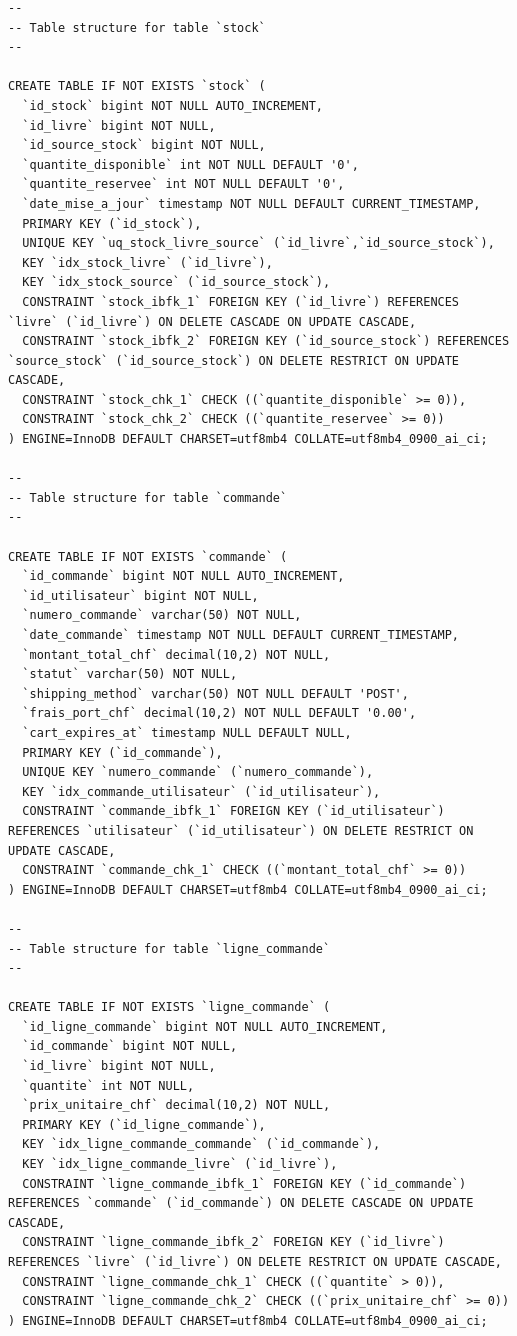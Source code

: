 \documentclass[12pt, a4paper]{report}
\renewcommand{\_}{\origunderscore\allowbreak}
\begin{document}
\begin{lstlisting}[style=sqlstyle, caption={Script DDL — Création de la base de données CARIBOOKS (extrait verbatim de \texttt{Schema.SQL})}, label={lst:ddl}]
--
-- Table structure for table `stock`
--

CREATE TABLE IF NOT EXISTS `stock` (
  `id_stock` bigint NOT NULL AUTO_INCREMENT,
  `id_livre` bigint NOT NULL,
  `id_source_stock` bigint NOT NULL,
  `quantite_disponible` int NOT NULL DEFAULT '0',
  `quantite_reservee` int NOT NULL DEFAULT '0',
  `date_mise_a_jour` timestamp NOT NULL DEFAULT CURRENT_TIMESTAMP,
  PRIMARY KEY (`id_stock`),
  UNIQUE KEY `uq_stock_livre_source` (`id_livre`,`id_source_stock`),
  KEY `idx_stock_livre` (`id_livre`),
  KEY `idx_stock_source` (`id_source_stock`),
  CONSTRAINT `stock_ibfk_1` FOREIGN KEY (`id_livre`) REFERENCES `livre` (`id_livre`) ON DELETE CASCADE ON UPDATE CASCADE,
  CONSTRAINT `stock_ibfk_2` FOREIGN KEY (`id_source_stock`) REFERENCES `source_stock` (`id_source_stock`) ON DELETE RESTRICT ON UPDATE CASCADE,
  CONSTRAINT `stock_chk_1` CHECK ((`quantite_disponible` >= 0)),
  CONSTRAINT `stock_chk_2` CHECK ((`quantite_reservee` >= 0))
) ENGINE=InnoDB DEFAULT CHARSET=utf8mb4 COLLATE=utf8mb4_0900_ai_ci;

--
-- Table structure for table `commande`
--

CREATE TABLE IF NOT EXISTS `commande` (
  `id_commande` bigint NOT NULL AUTO_INCREMENT,
  `id_utilisateur` bigint NOT NULL,
  `numero_commande` varchar(50) NOT NULL,
  `date_commande` timestamp NOT NULL DEFAULT CURRENT_TIMESTAMP,
  `montant_total_chf` decimal(10,2) NOT NULL,
  `statut` varchar(50) NOT NULL,
  `shipping_method` varchar(50) NOT NULL DEFAULT 'POST',
  `frais_port_chf` decimal(10,2) NOT NULL DEFAULT '0.00',
  `cart_expires_at` timestamp NULL DEFAULT NULL,
  PRIMARY KEY (`id_commande`),
  UNIQUE KEY `numero_commande` (`numero_commande`),
  KEY `idx_commande_utilisateur` (`id_utilisateur`),
  CONSTRAINT `commande_ibfk_1` FOREIGN KEY (`id_utilisateur`) REFERENCES `utilisateur` (`id_utilisateur`) ON DELETE RESTRICT ON UPDATE CASCADE,
  CONSTRAINT `commande_chk_1` CHECK ((`montant_total_chf` >= 0))
) ENGINE=InnoDB DEFAULT CHARSET=utf8mb4 COLLATE=utf8mb4_0900_ai_ci;

--
-- Table structure for table `ligne_commande`
--

CREATE TABLE IF NOT EXISTS `ligne_commande` (
  `id_ligne_commande` bigint NOT NULL AUTO_INCREMENT,
  `id_commande` bigint NOT NULL,
  `id_livre` bigint NOT NULL,
  `quantite` int NOT NULL,
  `prix_unitaire_chf` decimal(10,2) NOT NULL,
  PRIMARY KEY (`id_ligne_commande`),
  KEY `idx_ligne_commande_commande` (`id_commande`),
  KEY `idx_ligne_commande_livre` (`id_livre`),
  CONSTRAINT `ligne_commande_ibfk_1` FOREIGN KEY (`id_commande`) REFERENCES `commande` (`id_commande`) ON DELETE CASCADE ON UPDATE CASCADE,
  CONSTRAINT `ligne_commande_ibfk_2` FOREIGN KEY (`id_livre`) REFERENCES `livre` (`id_livre`) ON DELETE RESTRICT ON UPDATE CASCADE,
  CONSTRAINT `ligne_commande_chk_1` CHECK ((`quantite` > 0)),
  CONSTRAINT `ligne_commande_chk_2` CHECK ((`prix_unitaire_chf` >= 0))
) ENGINE=InnoDB DEFAULT CHARSET=utf8mb4 COLLATE=utf8mb4_0900_ai_ci;


\end{lstlisting}
\end{document}

